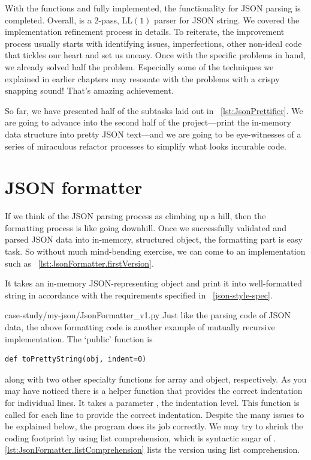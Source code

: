 With the functions  and  fully implemented,
the functionality for JSON parsing is completed.
Overall,  is a 2-pass, LL$(1)$ parser for JSON string.
We covered the implementation refinement process in details.
To reiterate, the improvement process usually starts with identifying issues,
imperfections, other non-ideal code that tickles our heart and set us uneasy.
Once with the specific problems in hand, we already solved half the problem.
Especially some of the techniques we explained in earlier chapters may
resonate with the problems with a crispy snapping sound!
That's amazing achievement.

So far, we have presented half of the subtasks laid out in ~\autoref{lst:JsonPrettifier}.
We are going to advance into the second half of the project---print the in-memory data
structure into pretty JSON text---and we are going to be eye-witnesses of a series of
miraculous refactor processes to simplify what looks incurable code.

\section{JSON formatter}\label{sec:jsonFormatter}

If we think of the JSON parsing process as climbing up a hill, then
the formatting process is like going downhill.
Once we successfully validated and parsed JSON data into in-memory, structured object,
the formatting part is easy task.
So without much mind-bending exercise, we can come to an implementation such as
~\autoref{lst:JsonFormatter.firstVersion}.

It takes an in-memory JSON-representing object and print it into well-formatted string in
accordance with the requirements specified in ~\autoref{json-style-spec}.

{case-study/my-json/JsonFormatter_v1.py}
Just like the parsing code of JSON data, the above formatting code is another example of
mutually recursive implementation.
The `public' function is
\begin{lstlisting}[label={lst:toPrettyString}]
def toPrettyString(obj, indent=0)
\end{lstlisting}
along with two other specialty functions for array and object, respectively.
As you may have noticed there is a helper function  that provides
the correct indentation for individual lines.
It takes a parameter , the indentation level.
This function is called for each line to provide the correct indentation.
Despite the many issues to be explained below, the program does its job correctly.
We may try to shrink the coding footprint by using list comprehension, which is syntactic sugar of
\python.
\autoref{lst:JsonFormatter.listComprehension} lists the version using list comprehension.

